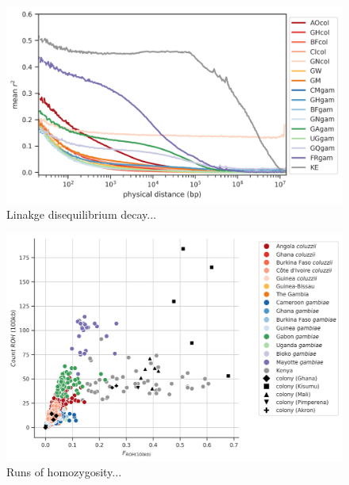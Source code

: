\documentclass[a4paper,11pt,abstracton,hidelinks]{scrartcl}
\begin{document}
\begin{figure}[H]
	\begin{center}
		\includegraphics*[width=6.3in]{artwork/ld_decay.jpeg}
	\end{center}
	\caption{Linakge disequilibrium decay...}
	\label{ld}
\end{figure}


\begin{figure}[H]
	\begin{center}
		\includegraphics*[width=6.3in]{artwork/roh.jpeg}
	\end{center}
	\caption{Runs of homozygosity...}
	\label{roh}
\end{figure}
\end{document}
